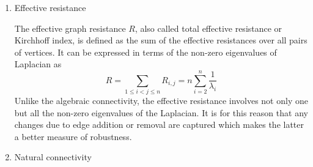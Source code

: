 \documentclass[10pt,a4paper]{article}
\theoremstyle{plain}
\theoremstyle{definition}
\begin{document}
\begin{enumerate}
		\item Effective resistance
		
		The effective graph resistance $R$, also called total effective resistance or Kirchhoff index, is
		defined as the sum of the effective resistances over all pairs of vertices. It can be expressed in terms of the non-zero eigenvalues of Laplacian as
		\begin{equation}
		R = \sum_{1\leq i < j \leq n} R_{i,j} = n \sum_{i=2}^{n} \frac{1}{\lambda_i}
		\end{equation}
		Unlike the algebraic connectivity, the effective resistance involves not only one but all the non-zero eigenvalues of the Laplacian. It is for this reason that any changes due to edge addition or removal are captured which makes the latter a better measure of robustness.
		\item Natural connectivity
		

\end{enumerate}
\end{document}
